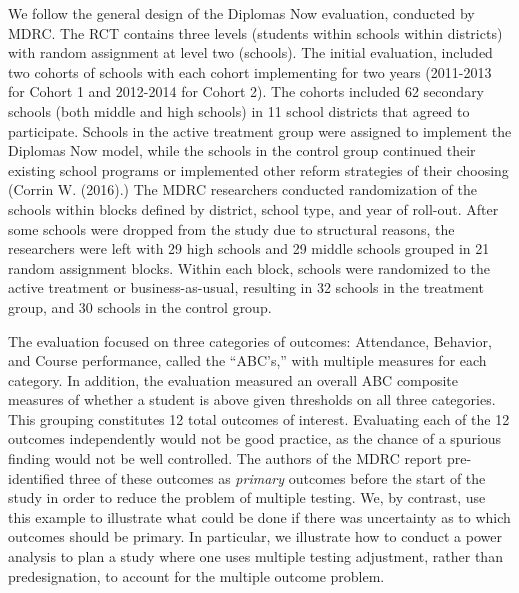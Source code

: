 \documentclass[
]{article}
\begin{document}
We follow the general design of the Diplomas Now evaluation, conducted
by MDRC. The RCT contains three levels (students within schools within
districts) with random assignment at level two (schools). The initial
evaluation, included two cohorts of schools with each cohort
implementing for two years (2011-2013 for Cohort 1 and 2012-2014 for
Cohort 2). The cohorts included 62 secondary schools (both middle and
high schools) in 11 school districts that agreed to participate. Schools
in the active treatment group were assigned to implement the Diplomas
Now model, while the schools in the control group continued their
existing school programs or implemented other reform strategies of their
choosing (Corrin W. (2016).) The MDRC researchers conducted
randomization of the schools within blocks defined by district, school
type, and year of roll-out. After some schools were dropped from the
study due to structural reasons, the researchers were left with 29 high
schools and 29 middle schools grouped in 21 random assignment blocks.
Within each block, schools were randomized to the active treatment or
business-as-usual, resulting in 32 schools in the treatment group, and
30 schools in the control group.

The evaluation focused on three categories of outcomes: Attendance,
Behavior, and Course performance, called the ``ABC's,'' with multiple
measures for each category. In addition, the evaluation measured an
overall ABC composite measures of whether a student is above given
thresholds on all three categories. This grouping constitutes 12 total
outcomes of interest. Evaluating each of the 12 outcomes independently
would not be good practice, as the chance of a spurious finding would
not be well controlled. The authors of the MDRC report pre-identified
three of these outcomes as \emph{primary} outcomes before the start of
the study in order to reduce the problem of multiple testing. We, by
contrast, use this example to illustrate what could be done if there was
uncertainty as to which outcomes should be primary. In particular, we
illustrate how to conduct a power analysis to plan a study where one
uses multiple testing adjustment, rather than predesignation, to account
for the multiple outcome problem.
\end{document}
